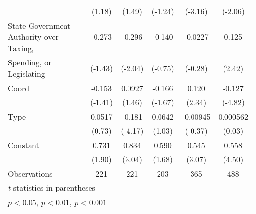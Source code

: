 \begin{table}[htbp]
\begin{tabular}{l*{5}{c}}
                                        &   (1.18)         &   (1.49)         &  (-1.24)         &  (-3.16)         &  (-2.06)         \\
\addlinespace
State Government Authority over Taxing, &   -0.273         &   -0.296\sym{*}  &   -0.140         &  -0.0227         &    0.125\sym{*}  \\
Spending, or Legislating                &  (-1.43)         &  (-2.04)         &  (-0.75)         &  (-0.28)         &   (2.42)         \\
\addlinespace
Coord                                   &   -0.153         &   0.0927         &   -0.166         &    0.120\sym{*}  &   -0.127\sym{***}\\
                                        &  (-1.41)         &   (1.46)         &  (-1.67)         &   (2.34)         &  (-4.82)         \\
\addlinespace
Type                                    &   0.0517         &   -0.181\sym{***}&   0.0642         & -0.00945         & 0.000562         \\
                                        &   (0.73)         &  (-4.17)         &   (1.03)         &  (-0.37)         &   (0.03)         \\
\addlinespace
Constant                                &    0.731         &    0.834\sym{**} &    0.590         &    0.545\sym{**} &    0.558\sym{***}\\
                                        &   (1.90)         &   (3.04)         &   (1.68)         &   (3.07)         &   (4.50)         \\
\midrule
Observations                            &      221         &      221         &      203         &      365         &      488         \\
\bottomrule
\multicolumn{6}{l}{\footnotesize \textit{t} statistics in parentheses}\\
\multicolumn{6}{l}{\footnotesize \sym{*} \(p<0.05\), \sym{**} \(p<0.01\), \sym{***} \(p<0.001\)}\\
\end{tabular}
\end{table}
